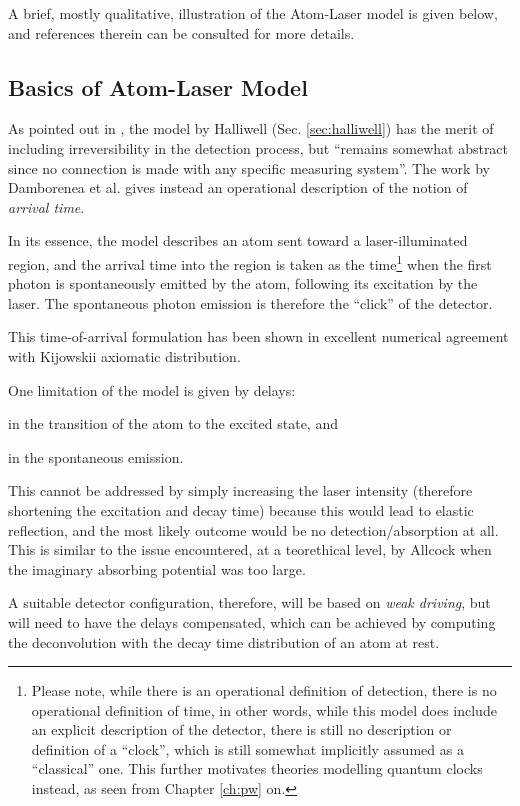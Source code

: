 A brief, mostly qualitative, illustration of the Atom-Laser model is
given below, and references therein can be consulted for more details.

\subsection{Basics of Atom-Laser Model}

As pointed out in \cite{Damborenea}, the model by Halliwell (Sec. \ref{sec:halliwell})
has the merit of including irreversibility in the detection process,
but ``remains somewhat abstract
since no connection is made with any specific measuring
system''. The work by Damborenea et al. \parencite{Damborenea} gives instead an operational
description of the notion of \emph{arrival time}.

In its essence, the model describes an atom sent toward a laser-illuminated region,
and the arrival time into the region is taken as the time\footnote{
  Please note, while there is an operational definition of detection,
  there is no operational definition of time, in other words,
  while this model does include an explicit description of the detector,
  there is still no description or definition of a ``clock'',
  which is still somewhat implicitly assumed as a ``classical'' one.
  This further motivates theories modelling quantum clocks instead,
  as seen from Chapter \ref{ch:pw} on.
}
when the first photon is spontaneously emitted by the atom,
following its excitation by the laser.
The spontaneous photon emission is therefore the ``click'' of the detector.

This time-of-arrival formulation has been shown in excellent numerical agreement
with Kijowskii axiomatic distribution.

One limitation of the model is given by delays:
\begin{enumerate*}[label=\arabic*)]
  \item in the transition of the atom to the excited state, and
  \item in the spontaneous emission.
\end{enumerate*}
This cannot be addressed by simply increasing the laser intensity
(therefore shortening the excitation and decay time)
because this would lead to elastic reflection,
and the most likely outcome would be no detection/absorption at all.
This is similar to the issue encountered, at a teorethical level,
by Allcock when the imaginary absorbing potential was too large.

A suitable detector configuration, therefore, will be based on \emph{weak driving},
but will need to have the delays compensated,
which can be achieved
by computing the
deconvolution with the decay time distribution of an atom at rest.


